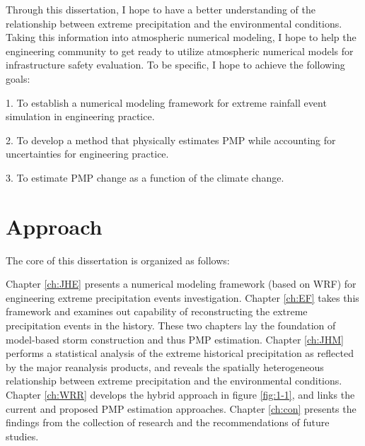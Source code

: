 Through this dissertation, I hope to have a better understanding of the relationship between extreme precipitation and the environmental conditions. Taking this information into atmospheric numerical modeling, I hope to help the engineering community to get ready to utilize atmospheric numerical models for infrastructure safety evaluation. To be specific, I hope to achieve the following goals:

1. To establish a numerical modeling framework for extreme rainfall event simulation in engineering practice.

2. To develop a method that physically estimates PMP while accounting for uncertainties for engineering practice.

3. To estimate PMP change as a function of the climate change.

\section {Approach}

The core of this dissertation is organized as follows:

Chapter \ref{ch:JHE} presents a numerical modeling framework (based on WRF) for engineering extreme precipitation events investigation. Chapter \ref{ch:EF} takes this framework and examines out capability of reconstructing the extreme precipitation events in the history. These two chapters lay the foundation of model-based storm construction and thus PMP estimation. Chapter \ref{ch:JHM} performs a statistical analysis of the extreme historical precipitation as reflected by the major reanalysis products, and reveals the spatially heterogeneous relationship between extreme precipitation and the environmental conditions. Chapter \ref{ch:WRR} develops the hybrid approach in figure \ref{fig:1-1}, and links the current and proposed PMP estimation approaches. Chapter \ref{ch:con} presents the findings from the collection of research and the recommendations of future studies.


